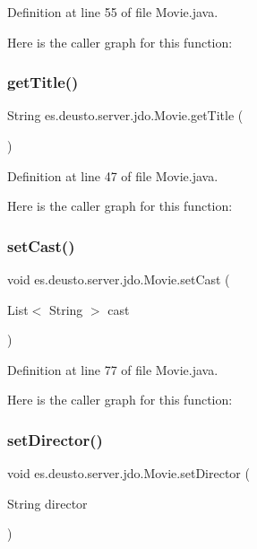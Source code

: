 Definition at line 55 of file Movie.\+java.

Here is the caller graph for this function\+:
\mbox{\label{classes_1_1deusto_1_1server_1_1jdo_1_1_movie_aa69d66c8aa0135b6ae9b809cf0692389}} 
\subsubsection{\texorpdfstring{getTitle()}{getTitle()}}
{\footnotesize\ttfamily String es.\+deusto.\+server.\+jdo.\+Movie.\+get\+Title (\begin{DoxyParamCaption}{ }\end{DoxyParamCaption})}



Definition at line 47 of file Movie.\+java.

Here is the caller graph for this function\+:
\mbox{\label{classes_1_1deusto_1_1server_1_1jdo_1_1_movie_aab7fa1af2944677769c47300ea061e3b}} 
\subsubsection{\texorpdfstring{setCast()}{setCast()}}
{\footnotesize\ttfamily void es.\+deusto.\+server.\+jdo.\+Movie.\+set\+Cast (\begin{DoxyParamCaption}\item[{List$<$ String $>$}]{cast }\end{DoxyParamCaption})}



Definition at line 77 of file Movie.\+java.

Here is the caller graph for this function\+:
\mbox{\label{classes_1_1deusto_1_1server_1_1jdo_1_1_movie_a2739245f04bc6627b5a00ddeb6fba0fc}} 
\subsubsection{\texorpdfstring{setDirector()}{setDirector()}}
{\footnotesize\ttfamily void es.\+deusto.\+server.\+jdo.\+Movie.\+set\+Director (\begin{DoxyParamCaption}\item[{String}]{director }\end{DoxyParamCaption})}



